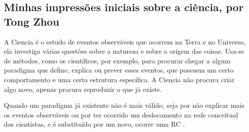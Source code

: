 \subsection{Minhas impressões iniciais sobre a ciência, por Tong Zhou}

A \gls{Ciencia} é o estudo de eventos observáveis que ocorrem na Terra e no Universo, ela investiga várias questões sobre a natureza e sobre a origem das coisas. Usa-se de métodos, como os científicos, por exemplo, para procurar chegar a algum paradigma que define, explica ou prever esses eventos, que 
possuem um certo comportamento e uma certa estrutura específica. A \gls{Ciencia} não procura criar algo novo, apenas procura reproduzir o que já existe. 

Quando um paradigma já existente não é mais válido, seja por não explicar mais os eventos observáveis ou por ter ocorrido um deslocamento na rede conceitual dos cientistas, e é substituído por um novo, ocorre uma \gls{RC} \citet{kuhn_estrutura_2001}.